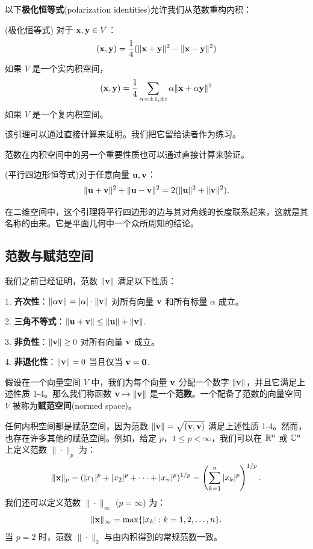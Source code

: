 以下\textbf{极化恒等式}(polarization identities)允许我们从范数重构内积：

\begin{lemma}\label{stmt:05-01-09}  (极化恒等式)
对于 $\mathbf{x}, \mathbf{y} \in V$：
$$(\mathbf{x}, \mathbf{y}) = \frac{1}{4} (\|\mathbf{x} + \mathbf{y}\|^2 - \|\mathbf{x} - \mathbf{y}\|^2)$$
 如果 $V$ 是一个实内积空间，
$$(\mathbf{x}, \mathbf{y}) = \frac{1}{4} \sum_{\alpha = \pm 1, \pm i} \alpha \|\mathbf{x} + \alpha \mathbf{y}\|^2$$
 如果 $V$ 是一个复内积空间。\end{lemma}

该引理可以通过直接计算来证明。我们把它留给读者作为练习。

范数在内积空间中的另一个重要性质也可以通过直接计算来验证。

\begin{lemma}\label{stmt:05-01-10}  (平行四边形恒等式)对于任意向量 $\mathbf{u}, \mathbf{v}$：
$$\|\mathbf{u} + \mathbf{v}\|^2 + \|\mathbf{u} - \mathbf{v}\|^2 = 2(\|\mathbf{u}\|^2 + \|\mathbf{v}\|^2).$$\end{lemma}

在二维空间中，这个引理将平行四边形的边与其对角线的长度联系起来，这就是其名称的由来。它是平面几何中一个众所周知的结论。

\subsection{范数与赋范空间}\label{sec:05-01-05}

我们之前已经证明，范数 $\|\mathbf{v}\|$ 满足以下性质：

1. \textbf{齐次性}：$\|\alpha \mathbf{v}\| = |\alpha| \cdot \|\mathbf{v}\|$ 对所有向量 $\mathbf{v}$ 和所有标量 $\alpha$ 成立。

2. \textbf{三角不等式}：$\|\mathbf{u} + \mathbf{v}\| \le \|\mathbf{u}\| + \|\mathbf{v}\|$.~

3. \textbf{非负性}：$\|\mathbf{v}\| \ge 0$ 对所有向量 $\mathbf{v}$ 成立。

4. \textbf{非退化性}：$\|\mathbf{v}\| = 0$ 当且仅当 $\mathbf{v} = \mathbf{0}$.~

假设在一个向量空间 $V$ 中，我们为每个向量 $\mathbf{v}$ 分配一个数字 $\|\mathbf{v}\|$，并且它满足上述性质 1-4。那么我们称函数 $\mathbf{v} \mapsto \|\mathbf{v}\|$ 是一个\textbf{范数}。一个配备了范数的向量空间 $V$ 被称为\textbf{赋范空间}(normed space)。

任何内积空间都是赋范空间，因为范数 $\|\mathbf{v}\| = \sqrt{(\mathbf{v}, \mathbf{v})}$ 满足上述性质 1-4。然而，也存在许多其他的赋范空间。例如，给定 $p$，$1 \le p < \infty$，我们可以在 $\mathbb{R}^n$ 或 $\mathbb{C}^n$ 上定义范数 $\| \cdot \|_p$ 为：
$$\|\mathbf{x}\|_p = (|x_1|^p + |x_2|^p + \dots + |x_n|^p)^{1/p} = \left( \sum_{k=1}^n |x_k|^p \right)^{1/p}.$$
我们还可以定义范数 $\| \cdot \|_\infty$ ($p = \infty$) 为：
$$\|\mathbf{x}\|_\infty = \max\{|x_k| : k = 1, 2, \dots, n\}.$$
当 $p=2$ 时，范数 $\| \cdot \|_2$ 与由内积得到的常规范数一致。

